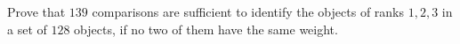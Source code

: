Prove that $139$ comparisons are sufficient to identify the objects of ranks $1, 2, 3$ in a set of $128$ objects, if no two of them have the same weight.
